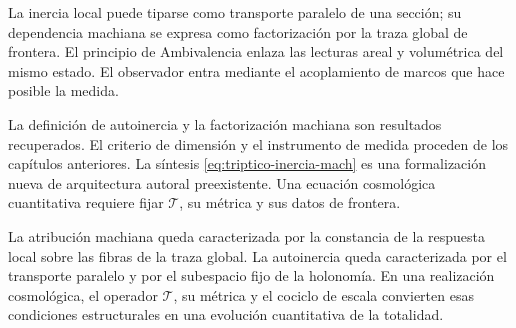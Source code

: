 \begin{resultbox}
La inercia local puede tiparse como transporte paralelo de una sección; su
dependencia machiana se expresa como factorización por la traza global de
frontera. El principio de Ambivalencia enlaza las lecturas areal y volumétrica
del mismo estado. El observador entra mediante el acoplamiento de marcos que
hace posible la medida.
\end{resultbox}

\begin{statusbox}
La definición de autoinercia y la factorización machiana son resultados
recuperados. El criterio de dimensión y el instrumento de medida proceden de
los capítulos anteriores. La síntesis \eqref{eq:triptico-inercia-mach} es una
formalización nueva de arquitectura autoral preexistente. Una ecuación
cosmológica cuantitativa requiere fijar \(\mathcal T\), su métrica y sus datos
de frontera.
\end{statusbox}

La atribución machiana queda caracterizada por la constancia de la respuesta
local sobre las fibras de la traza global. La autoinercia queda caracterizada
por el transporte paralelo y por el subespacio fijo de la holonomía. En una
realización cosmológica, el operador \(\mathcal T\), su métrica y el cociclo
de escala convierten esas condiciones estructurales en una evolución
cuantitativa de la totalidad.

